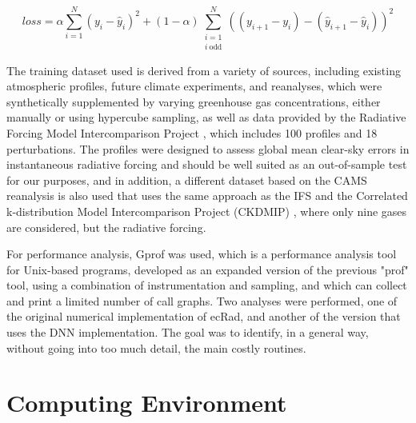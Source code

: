 \begin{equation}
loss = \alpha \sum_{i=1}^{N}(y_i - \hat{y}_i)^2 + (1 - \alpha)
\sum_{\substack{i=1 \\ i \ \text{odd}}}^{N} ( (y_{i+1} - y_i) - (\hat{y}_{i+1}-\hat{y}_i) )^2
\label{eq:ecrnn}
\end{equation}

The training dataset used is derived from a variety of sources, including existing atmospheric profiles, future climate experiments, and reanalyses, which were synthetically supplemented by varying greenhouse gas concentrations, either manually or using hypercube sampling, as well as data provided by the Radiative Forcing Model Intercomparison Project \cite{Pincus2016}, which includes 100 profiles and 18 perturbations. The profiles were designed to assess global mean clear-sky errors in instantaneous radiative forcing and should be well suited as an out-of-sample test for our purposes, and in addition, a different dataset based on the CAMS reanalysis \cite{Inness2019} is also used that uses the same approach as the IFS and the Correlated k-distribution Model Intercomparison Project (CKDMIP) \cite{Hogan2020}, where only nine gases are considered, but the radiative forcing.

For performance analysis, Gprof was used, which is a performance analysis tool for Unix-based programs, developed as an expanded version of the previous "prof" tool, using a combination of instrumentation and sampling, and which can collect and print a limited number of call graphs. Two analyses were performed, one of the original numerical implementation of ecRad, and another of the version that uses the DNN implementation. The goal was to identify, in a general way, without going into too much detail, the main costly routines.


\section{Computing Environment}
\label{sec:cenv}


